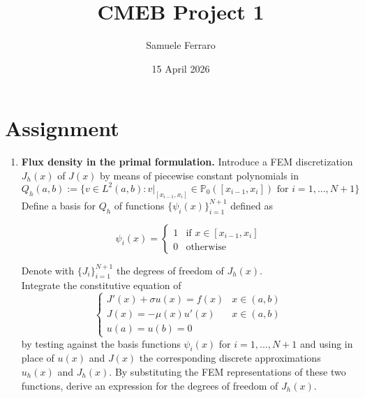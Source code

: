\documentclass{article}
\title{CMEB Project 1}
\author{Samuele Ferraro}
\date{15 April 2026}
\begin{document}
\maketitle
\newpage
\tableofcontents 
\newpage

\section{Assignment}
   

\begin{enumerate}[label=\alph*)]
    \item \textbf{Flux density in the primal formulation.} Introduce a FEM discretization $J_{h}(x)$ of $J(x)$ by means of piecewise constant polynomials in
    \begin{equation}
        Q_{h}(a,b):=\{v\in L^{2}(a,b):v|_{[x_{i-1},x_{i}]}\in\mathbb{P}_{0}([x_{i-1},x_{i}]) \text{ for } i=1,...,N+1\}
        \label{def:Q_h}
    \end{equation}
    Define a basis for $Q_{h}$ of functions $\{\psi_{i}(x)\}_{i=1}^{N+1}$ defined as

    \begin{equation}
    \psi_{i}(x) =
        \begin{cases}
            1 & \text{if } x \in [x_{i-1}, x_{i}] \\
            0 & \text{otherwise}
        \end{cases}
        \label{BasisFunctionPrimal}
    \end{equation}

    Denote with $\{J_{i}\}_{i=1}^{N+1}$ the degrees of freedom of $J_{h}(x)$.\\
    Integrate the constitutive equation of 
    \begin{equation}
        \begin{cases}
            J'(x) + \sigma u(x) = f(x) & x \in (a, b) \\
            J(x) = -\mu(x) u'(x)  & x \in (a, b) \\
            u(a) = u(b) = 0
        \end{cases}
        \label{PrimalWeakFormulation}
    \end{equation}
    by testing against the basis functions $\psi_{i}(x)$ for $i=1,...,N+1$ and using in place of $u(x)$ and $J(x)$ the corresponding discrete approximations $u_{h}(x)$ and $J_{h}(x)$. By substituting the FEM representations of these two functions, derive an expression for the degrees of freedom of $J_{h}(x)$.


\end{enumerate}
\end{document}

